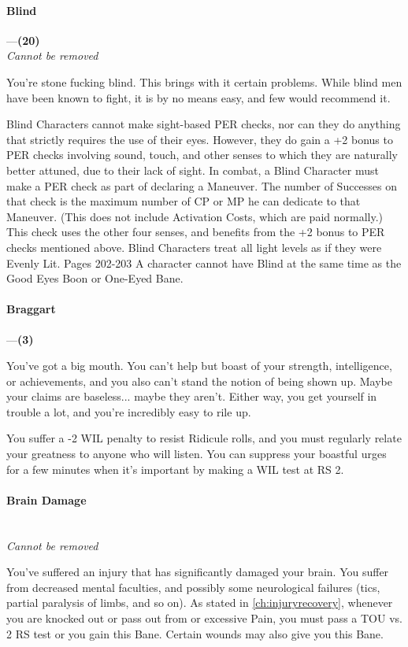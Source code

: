 \documentclass[oneside,11pt,english]{book}
\begin{document}
\paragraph{\label{bane:Blind}Blind}---\quad\textbf{(20)}\\
\emph{Cannot be removed}\par
You're stone fucking blind. This brings with it certain problems. While blind men have been known to fight, it is by no means easy, and few would recommend it. 

Blind Characters cannot make sight-based PER checks, nor can they do anything that strictly requires the 
use of their eyes. However, they do gain a +2 bonus to PER checks involving sound, touch, and other 
senses to which they are naturally better attuned, due to their lack of sight. In combat, a Blind Character 
must make a PER check as part of declaring a Maneuver. The number of Successes on that check is the 
maximum number of CP or MP he can dedicate to that Maneuver. (This does not include Activation 
Costs, which are paid normally.) 
This check uses the other four senses, and benefits from the +2 bonus to PER checks mentioned above. 
Blind Characters treat all light levels as if they were Evenly Lit. Pages 202-203 
A character cannot have Blind at the same time as the Good Eyes Boon or One-Eyed Bane. 
\paragraph{\label{bane:Braggart}Braggart}---\quad\textbf{(3)}\par
You've got a big mouth. You can't help but boast of your strength, intelligence, or achievements, and you 
also can't stand the notion of being shown up. Maybe your claims are baseless... maybe they aren't. Either 
way, you get yourself in trouble a lot, and you're incredibly easy to rile up. 


You suffer a -2 WIL penalty to resist Ridicule rolls, and you must regularly relate your greatness to 
anyone who will listen. You can suppress your boastful urges for a few minutes when it's important by 
making a WIL test at RS 2. 



\paragraph{\label{bane:Brain Damage}Brain Damage}\quad\\
\textit{Cannot be removed}\par
You've suffered an injury that has significantly damaged your brain. You suffer from decreased mental 
faculties, and possibly some neurological failures (tics, partial paralysis of
limbs, and so on). As stated in \autoref{ch:injuryrecovery}, whenever you are
knocked out or pass out from  or excessive Pain, you
must pass a TOU vs. 2 RS test or you gain this Bane. Certain wounds may also
give you this Bane.  
\end{document}
